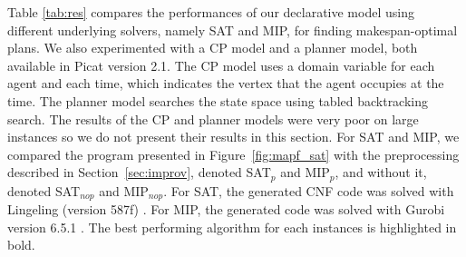 \documentclass[conference]{IEEEtran}
\begin{document}
Table \ref{tab:res} compares the performances of our declarative model using different underlying solvers, namely SAT and MIP, for finding makespan-optimal plans. We also experimented with a CP model and a planner model, both available in Picat version 2.1. The CP model uses a domain variable for each agent and each time, which indicates the vertex that the agent occupies at the time. The planner model searches the state space using tabled backtracking search. The results of the CP and planner models were very poor on large instances so we do not present their results in this section. 
For SAT and MIP, we compared the program presented in Figure~\ref{fig:mapf_sat} with the preprocessing described in Section~\ref{sec:improv}, denoted SAT$_p$ and MIP$_p$, and without it, denoted 
SAT$_{nop}$ and MIP$_{nop}$. 
For SAT, the generated CNF code was solved with Lingeling (version 587f) \cite{lingeling}.  For MIP, the generated code was solved with Gurobi version 6.5.1 \cite{gurobi}. The best performing algorithm for each instances is highlighted in bold. 

\end{document}
